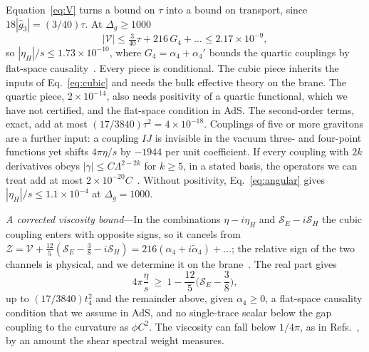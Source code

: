 \documentclass[aps,prl,twocolumn,superscriptaddress,nofootinbib,floatfix]{revtex4-2}
\begin{document}
Equation~\eqref{eq:V} turns a bound on $\tau$ into a bound on transport, since $18|\hat g_3|=(3/40)\tau$. At $\Delta_g\ge1000$
\begin{equation}
|\mathcal V|\le\tfrac3{40}\tau+216\,G_4+\dots\le2.17\times10^{-9},
\label{eq:Vbound}
\end{equation}
so $|\eta_H|/s\le1.73\times10^{-10}$, where $G_4=\alpha_4+\alpha_4'$ bounds the quartic couplings by flat-space
causality~\cite{CHLPS}. Every piece is conditional. The cubic piece inherits the inputs of Eq.~\eqref{eq:cubic} and needs the
bulk effective theory on the brane. The quartic piece, $2\times10^{-14}$, also needs positivity of a quartic functional, which
we have not certified, and the flat-space condition in AdS. The second-order terms, exact, add at most
$(17/3840)\tau^2=4\times10^{-18}$. Couplings of five or more gravitons are a further input: a coupling $IJ$ is invisible in the
vacuum three- and four-point functions yet shifts $4\pi\eta/s$ by $-1944$ per unit coefficient. If every coupling with $2k$
derivatives obeys $|\gamma|\le C\Lambda^{2-2k}$ for $k\ge5$, in a stated basis, the operators we can treat add at most
$2\times10^{-20}C$~\cite{SM}. Without positivity, Eq.~\eqref{eq:angular} gives $|\eta_H|/s\le1.1\times10^{-4}$ at $\Delta_g=1000$.

\textit{A corrected viscosity bound}---In the combinations $\eta-i\eta_H$ and $\mathcal S_E-i\mathcal S_H$ the cubic coupling enters
with opposite signs, so it cancels from $\mathcal Z=\mathcal V+\tfrac{12}5(\mathcal S_E-\tfrac38-i\mathcal S_H)=216(\alpha_4+i\tilde\alpha_4)+\dots$;
the relative sign of the two channels is physical, and we determine it on the brane~\cite{SM}. The real part gives
\begin{equation}
4\pi\frac\eta s\ \ge\ 1-\frac{12}5\Big(\mathcal S_E-\frac38\Big),
\label{eq:KSS}
\end{equation}
up to $(17/3840)t_4^2$ and the remainder above, given $\alpha_4\ge0$, a flat-space causality condition that we assume in AdS, and
no single-trace scalar below the gap coupling to the curvature as $\phi C^2$. The viscosity can fall below $1/4\pi$, as in
Refs.~\cite{Brigante:2007nu,Brigante:2008gz}, by an amount the shear spectral weight measures.
\end{document}
